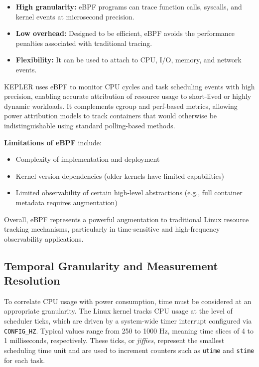 \begin{itemize}
    \item \textbf{High granularity:} eBPF programs can trace function calls, syscalls, and kernel events at microsecond precision.
    \item \textbf{Low overhead:} Designed to be efficient, eBPF avoids the performance penalties associated with traditional tracing.
    \item \textbf{Flexibility:} It can be used to attach to CPU, I/O, memory, and network events.
\end{itemize}

KEPLER uses eBPF to monitor CPU cycles and task scheduling events with high precision, enabling accurate attribution of resource usage to short-lived or highly dynamic workloads. It complements cgroup and perf-based metrics, allowing power attribution models to track containers that would otherwise be indistinguishable using standard polling-based methods.

\textbf{Limitations of eBPF} include:
\begin{itemize}
    \item Complexity of implementation and deployment
    \item Kernel version dependencies (older kernels have limited capabilities)
    \item Limited observability of certain high-level abstractions (e.g., full container metadata requires augmentation)
\end{itemize}

Overall, eBPF represents a powerful augmentation to traditional Linux resource tracking mechanisms, particularly in time-sensitive and high-frequency observability applications.


























\subsection{Temporal Granularity and Measurement Resolution}
\label{sec:granularity}
To correlate CPU usage with power consumption, time must be considered at an appropriate granularity. The Linux kernel tracks CPU usage at the level of scheduler ticks, which are driven by a system-wide timer interrupt configured via \texttt{CONFIG\_HZ}. Typical values range from 250 to 1000 Hz, meaning time slices of 4 to 1 milliseconds, respectively. These ticks, or \emph{jiffies}, represent the smallest scheduling time unit and are used to increment counters such as \texttt{utime} and \texttt{stime} for each task.

